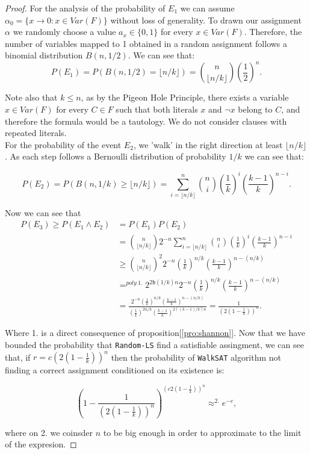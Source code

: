 \begin{proof}
For the analysis of the probability of $E_1$ we can assume $\alpha_0 = \{ x \to 0 : x \in Var(F)\}$ without loss of generality. To drawn our assignment $\alpha$ we randomly choose a value $a_x \in \{0,1\}$ for every $x \in Var(F)$. Therefore, the number of variables mapped to 1 obtained in a random assignment follows a binomial distribution $B(n, 1/2)$. We can see that:
$$P(E_1) = P(B(n,1/2) = \lfloor n/k\rfloor) = {\displaystyle {n \choose \lfloor n/k\rfloor }  \left (\frac{1}{2}\right )^{n}}. $$

Note also that $k\le n$, as by the Pigeon Hole Principle, there exists a variable $x\in Var(F)$ for every $C\in F$ such that both literals $x$ and $\neg x$ belong to $C$, and therefore the formula would be a tautology. We do not consider clauses with repeated literals.\\

For the probability of the event $E_2$, we 'walk' in the right direction at least $\lfloor n/k\rfloor$. As each step follows a Bernoulli distribution of probability $1/k$ we can see that:

$$P(E_2) =  P(B(n,1/k) \ge \lfloor n/k\rfloor) = {\displaystyle \sum _{i=\lfloor n/k\rfloor }^{n}{n \choose i }  \left (\frac{1}{k}\right )^{i}  \left (\frac{k-1}{k}\right )^{n-i}} .$$


Now we can see that
\begin{equation}
  \begin{split}
    P(E_3) \ge P(E_1 \land E_2)  & = P(E_1)P(E_2) \\
    & = {\displaystyle {n \choose \lfloor n/k\rfloor  }  2^{-n}} {\displaystyle \sum _{i=\lfloor n/k\rfloor }^{n}{n \choose i }  \left (\frac{1}{k}\right )^{i}  \left (\frac{k-1}{k}\right )^{n-i}}\\
    & \ge {\displaystyle {n \choose \lfloor n/k\rfloor  }^2  2^{-n}   \left (\frac{1}{k}\right )^{n/k}  \left (\frac{k-1}{k}\right )^{n-( n/k)}  } \\
    & =^{poly \ 1.} {\displaystyle 2^{2\mathfrak{h}(1/k) n}  2^{-n}   \left (\frac{1}{k}\right )^{ n/k}  \left (\frac{k-1}{k}\right )^{n-( n/k )}  }\\
    & = \frac{ 2^{-n}   \left (\frac{1}{k}\right )^{ n/k}  \left (\frac{k-1}{k}\right )^{n-( n/k )} }{(\frac{1}{k})^{2n/k} (\frac{k-1}{k})^{2((k-1)/k)n}  }
     =\frac{1}{\left ( 2\left (1-\frac{1}{k}\right ) \right )^n}. 
  \end{split}
\end{equation}

Where 1. is a direct consequence of proposition[\ref{pro:shannon}]. Now that we have bounded the probability that \texttt{Random-LS} find a satisfiable assingment, we can see that, if $r = c \left ( 2\left (1-\frac{1}{k}\right ) \right )^n$ then the probability of \texttt{WalkSAT} algorithm not finding a correct assignment conditioned on its existence is:

$$ \left ( 1-  \frac{1}{\left ( 2\left (1-\frac{1}{k}\right ) \right )^n} \right )^{\left ( c2\left (1-\frac{1}{k}\right ) \right )^n}  \approx^{2.} e^{-c},$$

where on 2. we coinsder $n$ to be big enough in order to approximate to the limit of the expresion.
\end{proof}

